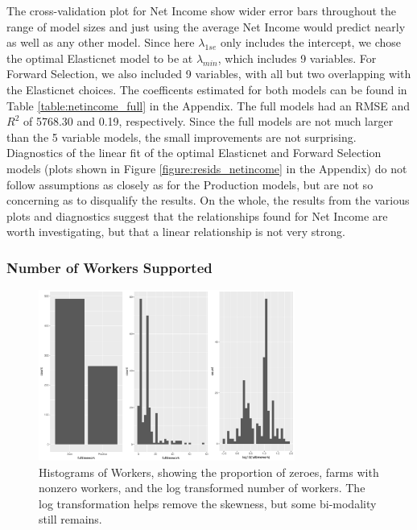 \documentclass{article}
\begin{document}
The cross-validation plot for Net Income show wider error bars throughout the range of model sizes and just using the average 
Net Income would predict nearly as well as any other model. Since here $\lambda_{1se}$ only includes the intercept, we 
chose the optimal Elasticnet model to be at $\lambda_{min}$, which includes 9 variables. For Forward Selection, we also 
included 9 variables, with all but two overlapping with the Elasticnet choices. The coefficents estimated for both models can be 
found in Table \ref{table:netincome_full} in the Appendix. The full models had an RMSE and $R^2$ of 5768.30 and 0.19, 
respectively. Since the full models are not much larger than the 5 variable models, the small improvements are not surprising. Diagnostics of the linear fit of the optimal Elasticnet and Forward Selection models (plots shown in Figure 
\ref{figure:resids_netincome} in the Appendix) do not follow assumptions as closely as for the Production models, but are not so 
concerning as to disqualify the results. On the whole, the results from the various plots and diagnostics suggest that the relationships found for Net Income are worth investigating, but that a linear relationship is not very strong.


\subsubsection{Number of Workers Supported}

\begin{figure}[h]
\centering
\includegraphics[width = 0.75\textwidth]{worker_histograms.pdf}
\caption{Histograms of Workers, showing the proportion of zeroes, farms with nonzero workers, and the log transformed number of workers. The log transformation helps remove the skewness, but some bi-modality still remains.}
\label{figure:workers_hist}
\end{figure}
\end{document}
